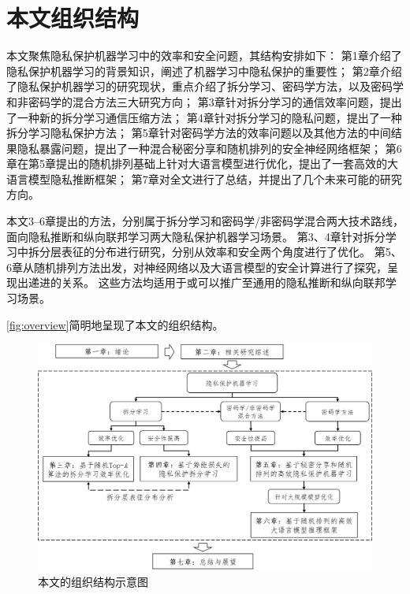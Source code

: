 \section{本文组织结构}
本文聚焦隐私保护机器学习中的效率和安全问题，其结构安排如下：
%
第1章介绍了隐私保护机器学习的背景知识，阐述了机器学习中隐私保护的重要性；
第2章介绍了隐私保护机器学习的研究现状，重点介绍了拆分学习、密码学方法，以及密码学和非密码学的混合方法三大研究方向；
第3章针对拆分学习的通信效率问题，提出了一种新的拆分学习通信压缩方法；
第4章针对拆分学习的隐私问题，提出了一种拆分学习隐私保护方法；
第5章针对密码学方法的效率问题以及其他方法的中间结果隐私暴露问题，提出了一种混合秘密分享和随机排列的安全神经网络框架；
第6章在第5章提出的随机排列基础上针对大语言模型进行优化，提出了一套高效的大语言模型隐私推断框架；
第7章对全文进行了总结，并提出了几个未来可能的研究方向。
%

本文3--6章提出的方法，分别属于拆分学习和密码学/非密码学混合两大技术路线，面向隐私推断和纵向联邦学习两大隐私保护机器学习场景。
%
第3、4章针对拆分学习中拆分层表征的分布进行研究，分别从效率和安全两个角度进行了优化。
%
第5、6章从随机排列方法出发，对神经网络以及大语言模型的安全计算进行了探究，呈现出递进的关系。
%
这些方法均适用于或可以推广至通用的隐私推断和纵向联邦学习场景。
%

\autoref{fig:overview}简明地呈现了本文的组织结构。

\begin{figure}[h!]
    \centering
    \includegraphics[width=\linewidth]{Z_Resources/article_overview.png}
    \caption{本文的组织结构示意图}
    \label{fig:overview}
\end{figure}
